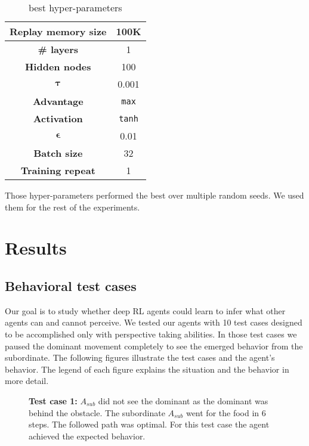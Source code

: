 \documentclass{article}
\begin{document}
\begin{table}[H]
    \centering
    \begin{tabular}{*{2}{|c|}}
    \hline
         \textbf{Replay memory size}& 100K\\
         \hline
         \textbf {\# layers }&1\\
         \hline
         \textbf {Hidden nodes}&100\\
         \hline
         \(\boldsymbol{\tau}\)&0.001\\
         \hline
         \textbf {Advantage}&\texttt{max} \\
         \hline
         \textbf {Activation}&\texttt{tanh}\\
         \hline
         \(\boldsymbol{\epsilon}\)&0.01\\
         \hline
         \textbf {Batch size}&32\\
         \hline
         \textbf {Training repeat} &1\\
    \hline
    \end{tabular}
    \caption{best hyper-parameters}
    \label{tab:best.hyp}
\end{table}

Those hyper-parameters performed the best over multiple random seeds. We used them for the rest of the experiments.

\section{Results}

\subsection{Behavioral test cases}
Our goal is to study whether deep RL agents could learn to infer what other agents can and cannot perceive. We tested our agents with 10 test cases designed to be accomplished only with perspective taking abilities. In those test cases we paused the dominant movement completely to see the emerged behavior from the subordinate. The following figures illustrate the test cases and the agent's behavior. The legend of each figure explains the situation and the behavior in more detail.

\begin{figure}[H]
    \centering
    \caption{\textbf {Test  case 1:} \(A_{sub}\) did not see the dominant as the dominant was behind the obstacle. The subordinate \(A_{sub}\) went for the food in 6 steps. The followed path was optimal.  For this test case the agent achieved the expected behavior.}
    \label{fig.tc.1}
\end{figure}
\end{document}
